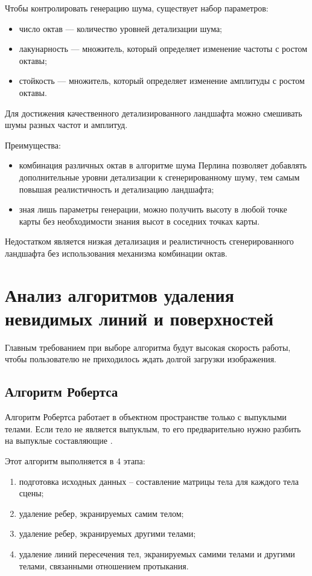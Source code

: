 Чтобы контролировать генерацию шума, существует набор параметров:

\begin{itemize}[label=--]
	\item число октав --- количество уровней детализации шума;
	\item лакунарность --- множитель, который определяет изменение частоты с ростом октавы;
	\item стойкость --- множитель, который определяет изменение амплитуды с ростом октавы.
\end{itemize}

Для достижения качественного детализированного ландшафта можно смешивать шумы разных частот и амплитуд.

Преимущества:

\begin{itemize}[label=--]
	\item комбинация различных октав в алгоритме шума Перлина позволяет
	добавлять дополнительные уровни детализации к сгенерированному
	шуму, тем самым повышая реалистичность и детализацию 
	ландшафта;
	\item зная лишь параметры генерации, можно получить высоту в любой
	точке карты без необходимости знания высот в соседних точках
	карты.
\end{itemize}

Недостатком является низкая детализация и реалистичность сгенерированного ландшафта без использования механизма комбинации октав.

\section{Анализ алгоритмов удаления невидимых линий и поверхностей}
 
Главным требованием при выборе алгоритма будут высокая скорость
работы, чтобы пользователю не приходилось ждать долгой загрузки
изображения.

\subsection{Алгоритм Робертса}

Алгоритм Робертса работает в объектном пространстве только с
выпуклыми телами. Если тело не является выпуклым, то его предварительно
нужно разбить на выпуклые составляющие \cite{info_rodjers}.

Этот алгоритм выполняется в 4 этапа:

\begin{enumerate}[label={\arabic*)}]
	\item подготовка исходных данных – составление матрицы тела для
	каждого тела сцены;
	\item удаление ребер, экранируемых самим телом;
	\item удаление ребер, экранируемых другими телами;
	\item удаление линий пересечения тел, экранируемых самими телами и
	другими телами, связанными отношением протыкания.
\end{enumerate}

